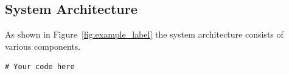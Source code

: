 \subsection{System Architecture}
As shown in Figure~\ref{fig:example_label} the system architecture consists of various components.

\begin{lstlisting}[style=cstyle, caption=Relevant Caption, label=lst:unique_label]
# Your code here
\end{lstlisting}

